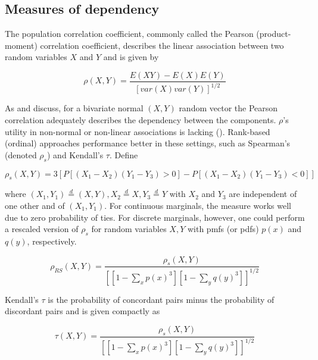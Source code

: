 \documentclass[
]{article}
\begin{document}
\hypertarget{measures-of-dependency}{%
\subsection{Measures of dependency}\label{measures-of-dependency}}

The population correlation coefficient, commonly called the Pearson (product-moment) correlation coefficient, describes the linear association between two random variables \(X\) and \(Y\) and is given by

\begin{equation}
\label{eq:pearson}
\rho(X,Y) = \frac{E(XY) - E(X)E(Y)}{\left[ var(X)var(Y)\right]^{1/2}} 
\end{equation}

As \citet{MB13} and \citet{MK01} discuss, for a bivariate normal \((X,Y)\) random vector the Pearson correlation adequately describes the dependency between the components. \(\rho\)'s utility in non-normal or non-linear associations is lacking (\citet{MK01}). Rank-based (ordinal) approaches performance better in these settings, such as Spearman's (denoted \(\rho_s\)) and Kendall's \(\tau\). Define

\begin{equation}
\label{eq:spearman}
\rho_s(X,Y) = 3 \left[ P\left[ (X_1 - X_2)(Y_1-Y_3) > 0 \right] - P\left[ (X_1 - X_2)(Y_1-Y_3) < 0 \right] \right]
\end{equation}

\noindent where \((X_1, Y_1) \overset{d}{=} (X,Y), X_2 \overset{d}{=} X, Y_3 \overset{d}{=} Y\) with \(X_2\) and \(Y_3\) are independent of one other and of \((X_1, Y_1)\). For continuous marginals, the measure works well due to zero probability of ties. For discrete marginals, however, one could perform a rescaled version of \(\rho_s\) for random variables \(X,Y\) with pmfs (or pdfs) \(p(x)\) and \(q(y)\), respectively.

\begin{equation}
\label{eq:spearmanRescaled}
\rho_{RS}(X,Y) = \frac{\rho_s(X,Y)}{ \left[ \left[ 1 - \sum_x p(x)^3 \right] \left[ 1 - \sum_y q(y)^3 \right] \right]^{1/2}}
\end{equation}

\noindent Kendall's \(\tau\) is the probability of concordant pairs minus the probability of discordant pairs and is given compactly as

\begin{equation}
  \label{eq:tau}
  \tau(X,Y) = \frac{\rho_s(X,Y)}{ \left[ \left[ 1 - \sum_x p(x)^3 \right] \left[ 1 - \sum_y q(y)^3 \right] \right]^{1/2}}
\end{equation}
\end{document}
